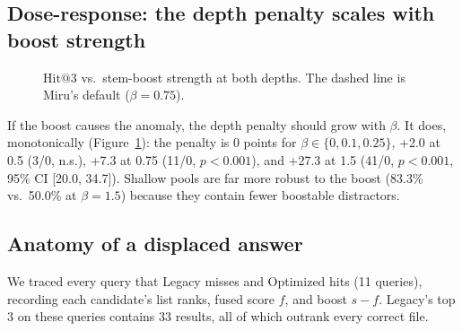 \documentclass[11pt, letterpaper]{article}
\makeatletter
\newcommand{\hit}{\mathrm{Hit@3}}
\makeatother
\begin{document}
\subsection{Dose-response: the depth penalty scales with boost strength}\label{sec:dose}
\begin{figure}[htbp]
\centering
{}
\caption{$\hit$ vs.\ stem-boost strength at both depths. The dashed line is Miru's default ($\beta{=}0.75$).}
\label{fig:dose}
\end{figure}

If the boost causes the anomaly, the depth penalty should grow with $\beta$. It does, monotonically (Figure~\ref{fig:dose}):
the penalty is 0 points for $\beta\in\{0, 0.1, 0.25\}$, +2.0 at 0.5 (3/0, n.s.), +7.3 at 0.75 (11/0, $p<0.001$), and
+27.3 at 1.5 (41/0, $p<0.001$, 95\% CI [20.0, 34.7]). Shallow pools are far more robust to the boost (83.3\% vs.\
50.0\% at $\beta{=}1.5$) because they contain fewer boostable distractors.

\subsection{Anatomy of a displaced answer}\label{sec:anatomy}
We traced every query that Legacy misses and Optimized hits (11 queries), recording each candidate's list ranks,
fused score $f$, and boost $s-f$. Legacy's top 3 on these queries contains 33 results, all of which outrank every
correct file.
\end{document}
